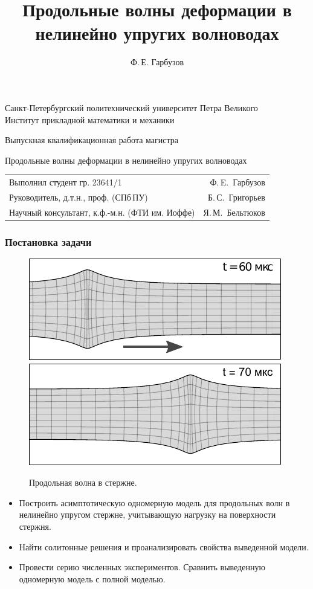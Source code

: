 \documentclass{beamer}
\title[Волны в нелинейно упругих стержнях]{Продольные волны деформации в нелинейно упругих волноводах}
\author[Ф.\,Е. Гарбузов]{Ф.\,Е. Гарбузов}
\begin{document}

\begin{frame}[plain]
\centering
{\footnotesize
Санкт-Петербургский политехнический университет Петра Великого\\
Институт прикладной математики и механики
}

\vspace{12mm}
Выпускная квалификационная работа магистра
\vspace{3mm}

{\Large\color{blue}
Продольные волны деформации в нелинейно упругих волноводах
}
\vspace{12mm}

{ \footnotesize 
\begin{tabularx}{.9\linewidth}{Xr}
	Выполнил студент гр. 23641/1 & Ф.\,E.~Гарбузов  
	\vspace{2mm}\\
	Руководитель, д.т.н., проф. (СПб\,ПУ) & Б.\,С.~Григорьев
	\vspace{2mm}\\
	Научный консультант, к.ф.-м.н. (ФТИ им. Иоффе)  & Я.\,М.~Бельтюков
\end{tabularx} 
}
\end{frame}

 
\begin{frame}
\frametitle{Постановка задачи}
\begin{figure}
	\includegraphics[width=0.46\linewidth]{figures/DeformedRod1}
	\hspace{5mm}
	\includegraphics[width=0.46\linewidth]{figures/DeformedRod2}
	\caption{Продольная волна в стержне.}
	\vspace{-5mm}
\end{figure}
\begin{itemize}
	\item Построить асимптотическую одномерную модель для продольных волн в нелинейно упругом стержне, учитывающую нагрузку на поверхности стержня.
	\item Найти солитонные решения и проанализировать свойства выведенной модели.
	\item Провести серию численных экспериментов. Сравнить выведенную одномерную модель с полной моделью.
\end{itemize}
\end{frame}
\end{document}

